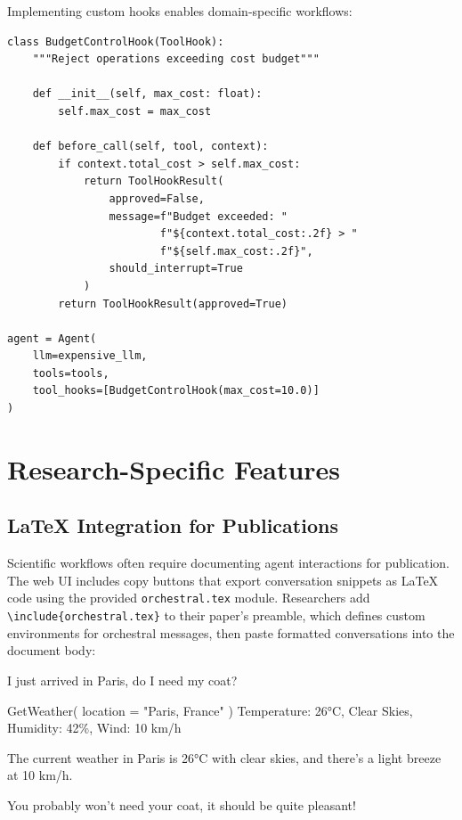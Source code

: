 \documentclass{article}
\begin{document}
Implementing custom hooks enables domain-specific workflows:

\begin{verbatim}
class BudgetControlHook(ToolHook):
    """Reject operations exceeding cost budget"""

    def __init__(self, max_cost: float):
        self.max_cost = max_cost

    def before_call(self, tool, context):
        if context.total_cost > self.max_cost:
            return ToolHookResult(
                approved=False,
                message=f"Budget exceeded: "
                        f"${context.total_cost:.2f} > "
                        f"${self.max_cost:.2f}",
                should_interrupt=True
            )
        return ToolHookResult(approved=True)

agent = Agent(
    llm=expensive_llm,
    tools=tools,
    tool_hooks=[BudgetControlHook(max_cost=10.0)]
)
\end{verbatim}

\section{Research-Specific Features}

\subsection{LaTeX Integration for Publications}

Scientific workflows often require documenting agent interactions for publication. The web UI includes copy buttons that export conversation snippets as LaTeX code using the provided \texttt{orchestral.tex} module. Researchers add \texttt{\textbackslash{}include\{orchestral.tex\}} to their paper's preamble, which defines custom environments for orchestral messages, then paste formatted conversations into the document body:

\begin{orchestralusermessage}
I just arrived in Paris, do I need my coat?
\end{orchestralusermessage}

\begin{orchestralagentmessage}

\begin{orchestraltoolmessage}{GetWeather( location = "Paris, France" )}
Temperature: 26°C, Clear Skies, Humidity: 42\%, Wind: 10 km/h
\end{orchestraltoolmessage}

The current weather in Paris is 26°C with clear skies, and there's a light breeze at 10 km/h.

You probably won't need your coat, it should be quite pleasant!
\end{orchestralagentmessage}
\end{document}
